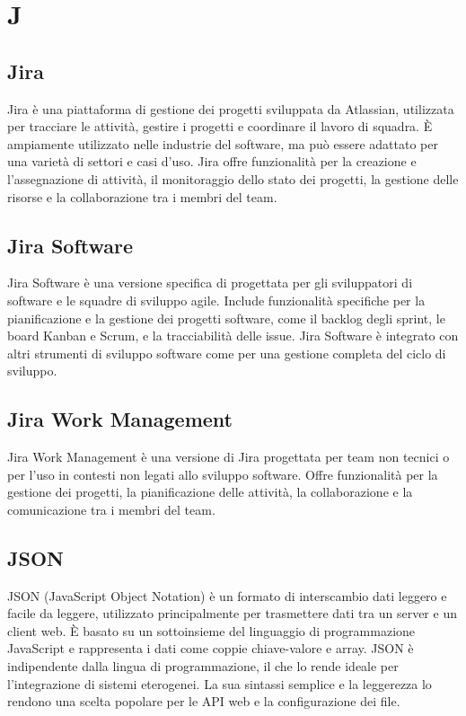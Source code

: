 \section{J}

\vspace{2em}
\subsection*{Jira}
Jira è una piattaforma di gestione dei progetti sviluppata da Atlassian, utilizzata per tracciare le attività, gestire i progetti e coordinare il lavoro di squadra. È ampiamente utilizzato nelle industrie del software, ma può essere adattato per una varietà di settori e casi d'uso. Jira offre funzionalità per la creazione e l'assegnazione di attività, il monitoraggio dello stato dei progetti, la gestione delle risorse e la collaborazione tra i membri del team.

\vspace{2em}
\subsection*{Jira Software}
Jira Software è una versione specifica di  progettata per gli sviluppatori di software e le squadre di sviluppo agile. Include funzionalità specifiche per la pianificazione e la gestione dei progetti software, come il backlog degli sprint, le board Kanban e Scrum, e la tracciabilità delle issue. Jira Software è integrato con altri strumenti di sviluppo software come  per una gestione completa del ciclo di sviluppo.

\vspace{2em}
\subsection*{Jira Work Management}
Jira Work Management è una versione di Jira progettata per team non tecnici o per l'uso in contesti non legati allo sviluppo software. Offre funzionalità per la gestione dei progetti, la pianificazione delle attività, la collaborazione e la comunicazione tra i membri del team.

\vspace{2em}
\subsection*{JSON}
JSON (JavaScript Object Notation) è un formato di interscambio dati leggero e facile da leggere, utilizzato principalmente per trasmettere dati tra un server e un client web. È basato su un sottoinsieme del linguaggio di programmazione JavaScript e rappresenta i dati come coppie chiave-valore e array. JSON è indipendente dalla lingua di programmazione, il che lo rende ideale per l'integrazione di sistemi eterogenei. La sua sintassi semplice e la leggerezza lo rendono una scelta popolare per le API web e la configurazione dei file.

